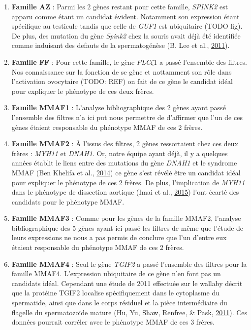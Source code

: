 \documentclass[12pt,twoside]{reedthesis}
\theoremstyle{definition}
\theoremstyle{definition}
\theoremstyle{remark}
\begin{document}
  \begin{enumerate}
  \def\labelenumi{\arabic{enumi}.}
  \item
    \textbf{Famille AZ} : Parmi les 2 gènes restant pour cette famille,
    \emph{SPINK2} est apparu comme étant un candidat évident. Notamment
    son expression étant spécifique au testicule tandis que celle de
    \emph{GUF1} est ubiquitaire (TODO fig). De plus, des mutation du gène
    \emph{Spink2} chez la souris avait déjà été identifiée comme induisant
    des defauts de la spermatogénèse (B. Lee et al.,
    \protect\hyperlink{ref-Lee2011}{2011}).
  \item
    \textbf{Famille FF} : Pour cette famille, le gène
    \emph{PLC}\(\zeta 1\) a passé l'ensemble des filtres. Nos connaissance
    sur la fonction de se gène et nottamment son rôle dans l'activation
    ovocytaire (TODO: REF) on fait de ce gène le candidat idéal pour
    expliquer le phénotype de ces deux frères.\\
  \item
    \textbf{Famille MMAF1} : L'analyse bibliographique des 2 gènes ayant
    passé l'ensemble des filtres n'a ici put nous permettre de d'affirmer
    que l'un de ces gènes étaient responsable du phénotype MMAF de ces 2
    frères.\\
  \item
    \textbf{Famille MMAF2} : À l'issus des filtres, 2 gènes ressortaient
    chez ces deux frères : \emph{MYH11} et \emph{DNAH1}. Or, notre équipe
    ayant déjà, il y a quelques années établit le liens entre des
    mutations du gène \emph{DNAH1} et le syndrome MMAF (Ben Khelifa et
    al., \protect\hyperlink{ref-BenKhelifa2014}{2014}) ce gène s'est
    révélé être un candidat idéal pour expliquer le phénotype de ces 2
    frères. De plus, l'implication de \emph{MYH11} dans le phénotype de
    dissection aortique (Imai et al.,
    \protect\hyperlink{ref-Imai2015}{2015}) l'ont écarté des candidats
    pour le phénotype MMAF.\\
  \item
    \textbf{Famille MMAF3} : Comme pour les gènes de la famille MMAF2,
    l'analyse bibliographique des 5 gènes ayant ici passé les filtres de
    même que l'étude de leurs expressions ne nous a pas permis de conclure
    que l'un d'entre eux étaient responsable du phénotype MMAF de ces 2
    frères.\\
  \item
    \textbf{Famille MMAF4} : Seul le gène \emph{TGIF2} a passé l'ensemble
    des filtres pour la famille MMAF4. L'expression ubiquitaire de ce gène
    n'en font pas un candidats idéal. Cependant une étude de 2011
    effectuée sur le wallaby décrit que la protéine TGIF2 localise
    spécifiquement dans le cytoplasme du spermatide, ainsi que dans le
    corps résiduel et la pièce intermédiaire du flagelle du spermatozoïde
    mature (Hu, Yu, Shaw, Renfree, \& Pask,
    \protect\hyperlink{ref-Hu2011}{2011}). Ces données pourrait corréler
    avec le phénotype MMAF de ces 3 frères.
  \end{enumerate}
  
\end{document}
